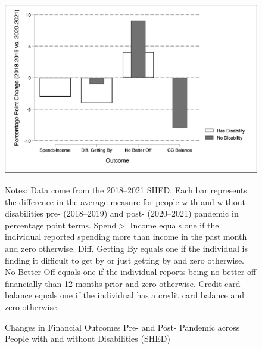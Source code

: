 \documentclass[12pt]{article}
\begin{document}
 \begin{figure}[h!]\label{SHED_Y}
\caption{Changes in Financial Outcomes Pre- and Post- Pandemic across People with and without Disabilities (SHED)}
\centering
\includegraphics[scale=0.4]{Exhibits/SHEDChange_DisNoDis.png}
\medskip 
\begin{minipage}{0.65\textwidth} 
{\footnotesize Notes: Data come from the 2018--2021 SHED. Each bar represents the difference in the average measure for people with and without disabilities pre- (2018--2019) and post- (2020--2021) pandemic in percentage point terms. Spend$>$ Income equals one if the individual reported spending more than income in the past month and zero otherwise. Diff. Getting By equals one if the individual is finding it difficult to get by or just getting by and zero otherwise. No Better Off equals one if the individual reports being no better off financially than 12 months prior and zero otherwise. Credit card balance equals one if the individual has a credit card balance and zero otherwise. \par}
\end{minipage}
\end{figure}
\end{document}
